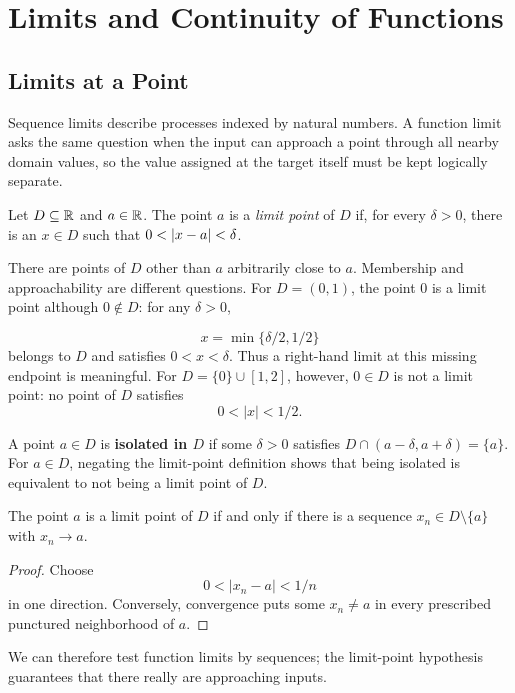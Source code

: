 \chapter{Limits and Continuity of Functions}
\label{ch:continuity}

\section{Limits at a Point}

Sequence limits describe processes indexed by natural numbers.  A function
limit asks the same question when the input can approach a point through all
nearby domain values, so the value assigned at the target itself must be
kept logically separate.

\begin{definition}
Let $D\subseteq\mathbb{R}$ and $a\in\mathbb{R}$. The point $a$ is a \emph{limit point} of $D$ if, for every $\delta>0$, there is an $x\in D$ such that $0<\lvert x-a\rvert<\delta$.
\end{definition}

There are points of $D$ other than $a$ arbitrarily close to $a$.
Membership and approachability are different questions. For $D=(0,1)$,
the point $0$ is a limit point although $0\notin D$: for any $\delta>0$,

\[
x=\min\{\delta/2,1/2\}
\]
 belongs to $D$ and satisfies $0<x<\delta$.
Thus a right-hand limit at this missing endpoint is meaningful.
For $D=\{0\}\cup[1,2]$, however, $0\in D$ is not a limit point:
no point of $D$ satisfies
\[
0<|x|<1/2.
\]


\begin{definition}
A point $a\in D$ is \textbf{isolated in $D$} if some $\delta>0$ satisfies
$D\cap(a-\delta,a+\delta)=\{a\}$. For $a\in D$, negating the
limit-point definition shows that being isolated is equivalent to not
being a limit point of $D$.
\end{definition}

\begin{proposition}
\label{prop:limit-point-sequence}
The point $a$ is a limit point of $D$ if and only if there is a sequence
$x_n\in D\setminus\{a\}$ with $x_n\to a$.
\end{proposition}
\begin{proof}
Choose
\[
0<|x_n-a|<1/n
\]
 in one direction. Conversely, convergence puts
some $x_n\ne a$ in every prescribed punctured neighborhood of $a$.
\end{proof}
We can therefore test function limits by sequences; the
limit-point hypothesis guarantees that there really are approaching inputs.

